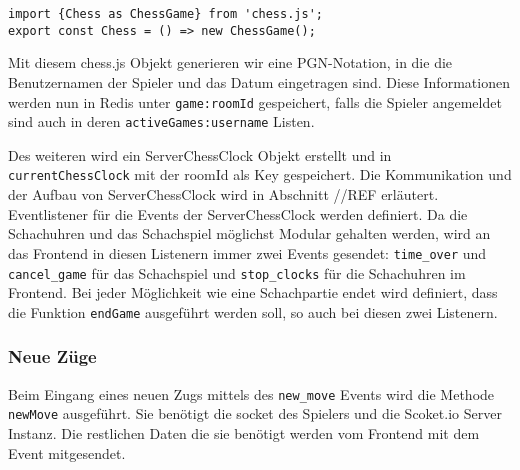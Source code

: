\begin{lstlisting}[style=codeStyle, caption={Die Chess.mjs Datei}, label={lst:Chess.mjs}]
import {Chess as ChessGame} from 'chess.js';
export const Chess = () => new ChessGame();
\end{lstlisting}

Mit diesem chess.js Objekt generieren wir eine PGN-Notation, in die die Benutzernamen der Spieler und das Datum eingetragen sind. Diese Informationen werden nun in Redis unter \verb|game:roomId| gespeichert, falls die Spieler angemeldet sind auch in deren \verb|activeGames:username| Listen. 

Des weiteren wird ein ServerChessClock Objekt erstellt und in \verb|currentChessClock| mit der roomId als Key gespeichert. Die Kommunikation und der Aufbau von ServerChessClock wird in Abschnitt //REF erläutert.
Eventlistener für die Events der ServerChessClock werden definiert.
Da die Schachuhren und das Schachspiel möglichst Modular gehalten werden, wird an das Frontend in diesen Listenern immer zwei Events gesendet: \verb|time_over| und \verb|cancel_game| für das Schachspiel und \verb|stop_clocks| für die Schachuhren im Frontend. Bei jeder Möglichkeit wie eine Schachpartie endet wird definiert, dass die Funktion \verb|endGame| ausgeführt werden soll, so auch bei diesen zwei Listenern.

\subsubsection{Neue Züge}
\label{sec:new_move_backend}
Beim Eingang eines neuen Zugs mittels des \verb|new_move| Events wird die Methode \verb|newMove| ausgeführt. Sie benötigt die socket des Spielers und die Scoket.io Server Instanz. Die restlichen Daten die sie benötigt werden vom Frontend mit dem Event mitgesendet.

